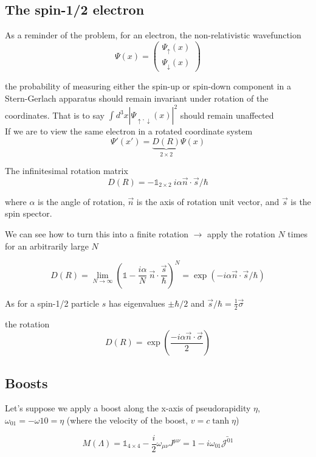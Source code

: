 \documentclass[11pt]{article}
\begin{document}
		 \subsection*{The spin-1/2 electron}
		 
		 As a reminder of the problem, for an electron, the non-relativistic wavefunction \[ \Psi(x) = \begin{pmatrix}
		 	\Psi_{\uparrow}(x) \\ \Psi_{\downarrow}(x)
		 \end{pmatrix}\]
	 
	 	the probability of measuring either the spin-up or spin-down component in a Stern-Gerlach apparatus should remain invariant under rotation of the coordinates. That is to say $\int d^3x |\Psi_{\uparrow, \downarrow}(x)|^2 $ should remain unaffected\\
	 	
	 	If we are to view the same electron in a rotated coordinate system \[ \Psi'(x') = \underbrace{D(R)}_{2\times 2} \Psi(x)\]

		The infinitesimal rotation matrix $$D(R) = -\mathbb{1}_{2\times 2}\ i\alpha\vec{n}\cdot \vec{s}/\hbar$$

		where $\alpha$ is the angle of rotation, $\vec{n}$ is the axis of rotation unit vector, and $\vec{s}$ is the spin spector.
	 	
	 	We can see how to turn this into a finite rotation $\rightarrow$ apply the rotation $N$ times for an arbitrarily large $N$
	 	
	 	\[ D(R) = \lim_{N\to\infty} \left( \mathbb{1} - \frac{i\alpha}{N}\ \vec{n}\cdot \frac{\vec{s}}{\hbar} \right)^N = \exp(-i\alpha\vec{n}\cdot\vec{s}/\hbar) \]
	 	
	 	As for a spin-1/2 particle $s$ has eigenvalues $\pm \hbar/2$ and $\vec{s}/\hbar = \frac{1}{2}\vec{\sigma}$
	 	
	 	the rotation \[ D(R) = \exp (\frac{-i\alpha\vec{n}\cdot \vec{\sigma}}{2}) \]
	 	 
	 	 \subsection*{Boosts}
	 	 Let's suppose we apply a boost along the x-axis of pseudorapidity $\eta$, $\omega_{01} = -\omega{10} = \eta$ (where the velocity of the boost, $v = c \tanh \eta$)
	 	 
	 	 \[ M(\Lambda) = \mathbb{1}_{4\times 4} - \frac{i}{2} \omega_{\mu\nu} J^{\mu\nu} = 1-i\omega_{01} \bar{\mathcal{J}^{01}} \]
	 	 
\end{document}

